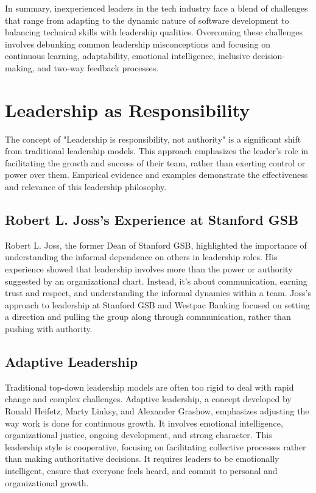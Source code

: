 \documentclass[runningheads]{llncs}
\begin{document}
\begin{description}
In summary, inexperienced leaders in the tech industry face a blend of challenges that range from adapting to the dynamic nature of software development to balancing technical skills with leadership qualities. Overcoming these challenges involves debunking common leadership misconceptions and focusing on continuous learning, adaptability, emotional intelligence, inclusive decision-making, and two-way feedback processes.
  \\

\end{description}

\section{Leadership as Responsibility}

The concept of "Leadership is responsibility, not authority" is a significant shift from traditional leadership models. This approach emphasizes the leader's role in facilitating the growth and success of their team, rather than exerting control or power over them. Empirical evidence and examples demonstrate the effectiveness and relevance of this leadership philosophy.

\subsection{Robert L. Joss's Experience at Stanford GSB}

Robert L. Joss, the former Dean of Stanford GSB, highlighted the importance of understanding the informal dependence on others in leadership roles. His experience showed that leadership involves more than the power or authority suggested by an organizational chart. Instead, it's about communication, earning trust and respect, and understanding the informal dynamics within a team. Joss's approach to leadership at Stanford GSB and Westpac Banking focused on setting a direction and pulling the group along through communication, rather than pushing with authority.

\subsection{Adaptive Leadership}

Traditional top-down leadership models are often too rigid to deal with rapid change and complex challenges. Adaptive leadership, a concept developed by Ronald Heifetz, Marty Linksy, and Alexander Grashow, emphasizes adjusting the way work is done for continuous growth. It involves emotional intelligence, organizational justice, ongoing development, and strong character. This leadership style is cooperative, focusing on facilitating collective processes rather than making authoritative decisions. It requires leaders to be emotionally intelligent, ensure that everyone feels heard, and commit to personal and organizational growth.
\end{document}
